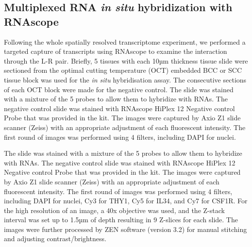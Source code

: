 \subsection{Multiplexed RNA \textit{in situ} hybridization with RNAscope}
Following the whole spatially resolved transcriptome experiment, we performed a targeted capture of transcripts using RNAscope to examine the interaction through the L-R pair. Briefly, 5 tissues with each 10µm thickness tissue slide were sectioned from the optimal cutting temperature (OCT) embedded BCC or SCC tissue block was used for the \textit{in situ} hybridisation assay. The consecutive sections of each OCT block were made for the negative control. The slide was stained with a mixture of the 5 probes to allow them to hybridize with RNAs. The negative control slide was stained with RNAscope HiPlex 12 Negative control Probe that was provided in the kit. The images were captured by Axio Z1 slide scanner (Zeiss) with an appropriate adjustment of each fluorescent intensity. The first round of images was performed using 4 filters, including DAPI for nuclei.

The slide was stained with a mixture of the 5 probes to allow them to hybridize with RNAs. The negative control slide was stained with RNAscope HiPlex 12 Negative control Probe that was provided in the kit. The images were captured by Axio Z1 slide scanner (Zeiss) with an appropriate adjustment of each fluorescent intensity. The first round of images was performed using 4 filters, including DAPI for nuclei, Cy3 for THY1, Cy5 for IL34, and Cy7 for CSF1R. For the high resolution of an image, a 40x objective was used, and the Z-stack interval was set up to 1.5µm of depth resulting in 9 Z-slices for each slide. The images were further processed by ZEN software (version 3.2) for manual stitching and adjusting contrast/brightness.

